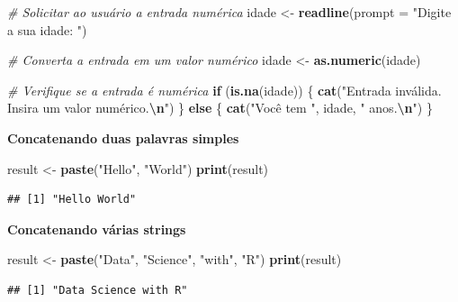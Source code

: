 \documentclass[
]{book}
\newenvironment{Shaded}{\begin{snugshade}}{\end{snugshade}}
\newcommand{\AttributeTok}[1]{\textcolor[rgb]{0.13,0.29,0.53}{#1}}
\newcommand{\CommentTok}[1]{\textcolor[rgb]{0.56,0.35,0.01}{\textit{#1}}}
\newcommand{\ControlFlowTok}[1]{\textcolor[rgb]{0.13,0.29,0.53}{\textbf{#1}}}
\newcommand{\FunctionTok}[1]{\textcolor[rgb]{0.13,0.29,0.53}{\textbf{#1}}}
\newcommand{\NormalTok}[1]{#1}
\newcommand{\OtherTok}[1]{\textcolor[rgb]{0.56,0.35,0.01}{#1}}
\newcommand{\SpecialCharTok}[1]{\textcolor[rgb]{0.81,0.36,0.00}{\textbf{#1}}}
\newcommand{\StringTok}[1]{\textcolor[rgb]{0.31,0.60,0.02}{#1}}
\begin{document}
\begin{Shaded}
\begin{Highlighting}[]
\CommentTok{\# Solicitar ao usuário a entrada numérica}
\NormalTok{idade }\OtherTok{\textless{}{-}} \FunctionTok{readline}\NormalTok{(}\AttributeTok{prompt =} \StringTok{"Digite a sua idade: "}\NormalTok{)}
    
\CommentTok{\# Converta a entrada em um valor numérico}
\NormalTok{idade }\OtherTok{\textless{}{-}} \FunctionTok{as.numeric}\NormalTok{(idade)}
    
\CommentTok{\# Verifique se a entrada é numérica}
\ControlFlowTok{if}\NormalTok{ (}\FunctionTok{is.na}\NormalTok{(idade)) \{}
\FunctionTok{cat}\NormalTok{(}\StringTok{"Entrada inválida. Insira um valor numérico.}\SpecialCharTok{\textbackslash{}n}\StringTok{"}\NormalTok{)}
\NormalTok{\} }\ControlFlowTok{else}\NormalTok{ \{}
  \FunctionTok{cat}\NormalTok{(}\StringTok{"Você tem "}\NormalTok{, idade, }\StringTok{" anos.}\SpecialCharTok{\textbackslash{}n}\StringTok{"}\NormalTok{)}
\NormalTok{\}}
\end{Highlighting}
\end{Shaded}

\textbf{Concatenando duas palavras simples}

\begin{Shaded}
\begin{Highlighting}[]
\NormalTok{result }\OtherTok{\textless{}{-}} \FunctionTok{paste}\NormalTok{(}\StringTok{"Hello"}\NormalTok{, }\StringTok{"World"}\NormalTok{)}
\FunctionTok{print}\NormalTok{(result)}
\end{Highlighting}
\end{Shaded}

\begin{verbatim}
## [1] "Hello World"
\end{verbatim}

\textbf{Concatenando várias strings}

\begin{Shaded}
\begin{Highlighting}[]
\NormalTok{result }\OtherTok{\textless{}{-}} \FunctionTok{paste}\NormalTok{(}\StringTok{"Data"}\NormalTok{, }\StringTok{"Science"}\NormalTok{, }\StringTok{"with"}\NormalTok{, }\StringTok{"R"}\NormalTok{)}
\FunctionTok{print}\NormalTok{(result)}
\end{Highlighting}
\end{Shaded}

\begin{verbatim}
## [1] "Data Science with R"
\end{verbatim}
\end{document}
